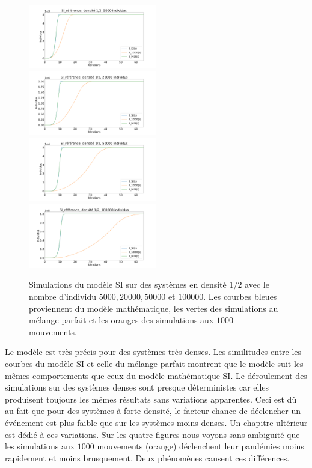 \begin{figure}
    \centering
    \captionsetup{justification=centering}
    \includegraphics[width=0.5\textwidth]{Images/SI_ref_2_5k.pdf}
    \includegraphics[width=0.5\textwidth]{Images/SI_ref_2_20k.pdf}
    \includegraphics[width=0.5\textwidth]{Images/SI_ref_2_50k.pdf}
    \includegraphics[width=0.5\textwidth]{Images/SI_ref_2_100k.pdf}
    \caption[Simulations de SI, densité 1/2]{Simulations du modèle SI sur des systèmes en densité $1/2$ avec le nombre d'individu $5000,20000,50000$ et $100000$. Les courbes bleues proviennent du modèle mathématique, les vertes des simulations au mélange parfait et les oranges des simulations aux $1000$ mouvements.}
\end{figure}

Le modèle est très précis pour des systèmes très denses. Les similitudes entre les courbes du modèle SI et celle du mélange parfait montrent que le modèle suit les mêmes comportements que ceux du modèle mathématique SI. Le déroulement des simulations sur des systèmes denses sont presque déterministes car elles produisent toujours les mêmes résultats sans variations apparentes. Ceci est dû au fait que pour des systèmes à forte densité, le facteur chance de déclencher un événement est plus faible que sur les systèmes moins denses. Un chapitre ultérieur est dédié à ces variations. Sur les quatre figures nous voyons sans ambiguïté que les simulations aux $1000$ mouvements (orange) déclenchent leur pandémies moins rapidement et moins brusquement. Deux phénomènes causent ces différences. \\

